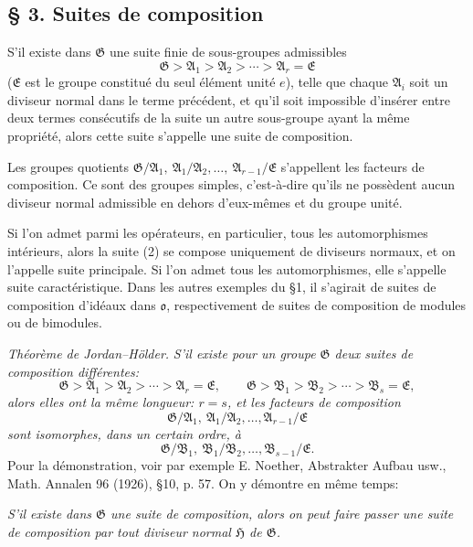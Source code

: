 
\providecommand{\mG}{\mathfrak{G}}
\providecommand{\mA}{\mathfrak{A}}
\providecommand{\mB}{\mathfrak{B}}
\providecommand{\mE}{\mathfrak{E}}
\providecommand{\mH}{\mathfrak{H}}
\providecommand{\mo}{\mathfrak{o}}

\subsection*{\S{} 3. Suites de composition}

S'il existe dans $\mG$ une suite finie de sous-groupes admissibles
\[
        \mG>\mA_1>\mA_2>\cdots>\mA_r=\mE \tag{2}
\]
($\mE$ est le groupe constitué du seul élément unité $e$), telle que chaque $\mA_i$ soit un diviseur normal dans le terme précédent, et qu'il soit impossible d'insérer entre deux termes consécutifs de la suite un autre sous-groupe ayant la même propriété, alors cette suite s'appelle une suite de composition.

Les groupes quotients $\mG/\mA_1,\ \mA_1/\mA_2,\ldots,\ \mA_{r-1}/\mE$ s'appellent les facteurs de composition. Ce sont des groupes simples, c'est-à-dire qu'ils ne possèdent aucun diviseur normal admissible en dehors d'eux-mêmes et du groupe unité.

Si l'on admet parmi les opérateurs, en particulier, tous les automorphismes intérieurs, alors la suite (2) se compose uniquement de diviseurs normaux, et on l'appelle suite principale. Si l'on admet tous les automorphismes, elle s'appelle suite caractéristique. Dans les autres exemples du \S{}1, il s'agirait de suites de composition d'idéaux dans $\mo$, respectivement de suites de composition de modules ou de bimodules.

\emph{Théorème de Jordan--Hölder.} \emph{S'il existe pour un groupe $\mG$ deux suites de composition différentes:}
\[
        \mG>\mA_1>\mA_2>\cdots>\mA_r=\mE,
        \qquad
        \mG>\mB_1>\mB_2>\cdots>\mB_s=\mE,
\]
\emph{alors elles ont la même longueur: $r=s$, et les facteurs de composition}
\[
        \mG/\mA_1,\ \mA_1/\mA_2,\ldots,\mA_{r-1}/\mE
\]
\emph{sont isomorphes, dans un certain ordre, à}
\[
        \mG/\mB_1,\ \mB_1/\mB_2,\ldots,\mB_{s-1}/\mE.
\]
Pour la démonstration, voir par exemple E. Noether, Abstrakter Aufbau usw., Math. Annalen 96 (1926), \S{}10, p. 57. On y démontre en même temps:

\emph{S'il existe dans $\mG$ une suite de composition, alors on peut faire passer une suite de composition par tout diviseur normal $\mH$ de $\mG$.}

